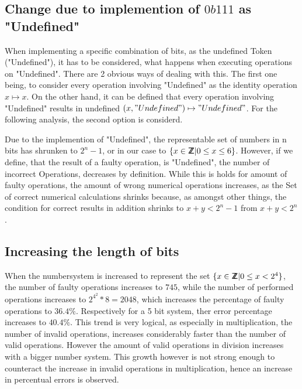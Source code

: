 \documentclass{aiaa-tc}
\newcommand*{\ZZ}{%
  \textsf{Z\kern-1ex Z}%
}
\begin{document}
\subsection{Change due to implemention of $0b111$ as "Undefined"}
When implementing a specific combination of bits, as the undefined Token ("Undefined"), it has to be considered, what happens when executing operations on "Undefined".
There are 2 obvious ways of dealing with this. The first one being, to consider every operation involving "Undefined" as the identity operation $ x \mapsto x$.
On the other hand, it can be defined that every operation involving "Undefined" results in undefined $(x, "Undefined") \mapsto "Undefined"$.
For the following analysis, the second option is considerd. \par
Due to the implemention of "Undefined", the representable set of numbers in n bits has shrunken to $2^n -1$, or in our case to $ \{ x \in \ZZ | 0 \leq x \leq 6 \} $.
However, if we define, that the result of a faulty operation, is "Undefined", the number of incorrect Operations, decreases by definition. While this is holds for amount
of faulty operations, the amount of wrong numerical operations increases, as the Set of correct numerical calculations shrinks because, as amongst other things,
the condition for correct results in addition shrinks to $x + y < 2^n - 1$ from $x + y < 2^n$.

\subsection{Increasing the length of bits}
When the numbersystem is increased to represent the set $ \{ x \in \ZZ | 0 \leq x < 2^4 \} $, the number of faulty operations increases to $745$, while the number of 
performed operations increases to $2^{4^{2}} * 8 = 2048$, which increases the percentage of faulty operations to $36.4 \% $. Respectively for a 5 bit system, ther error
percentage increases to $40.4 \%$. This trend is very logical, as especially in multiplication, the number of invalid operations, increases considerably faster than the
number of valid operations. However the amount of valid operations in division increases with a bigger number system. This growth however is not strong enough to counteract
the increase in invalid operations in multiplication, hence an increase in percentual errors is observed.
\end{document}
